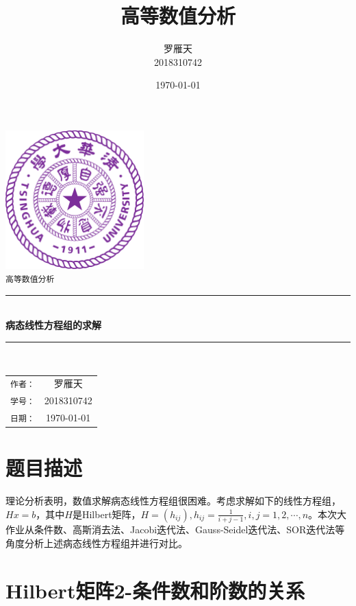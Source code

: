 \documentclass[a4paper]{article}
\title{高等数值分析}
\author{罗雁天 \\
2018310742}
\date{\today}
\begin{document}
\newcommand{\HRule}{\rule{\linewidth}{0.5mm}}
\begin{titlepage}
	\begin{center}
		\includegraphics[width=0.4\textwidth]{Tsinghua2.png}\\[1cm]
		\textsc{\Large \texttt{高等数值分析}}\\[1cm]
		\HRule \\[1cm]
		{\Huge \bfseries 病态线性方程组的求解}\\[0.4cm]
		\HRule \\[3.5cm]
		\begin{minipage}{0.4\textwidth}
			\begin{center}
				\Large
				\begin{tabular}{cc}
					\texttt{作者：} & 罗雁天 \\[0.5cm]
					\texttt{学号：} & 2018310742 \\[0.5cm]
					\texttt{日期：} & \today
				\end{tabular}
			\end{center}
		\end{minipage}
		\vfill
	\end{center}
\end{titlepage}

\section{题目描述}
理论分析表明，数值求解病态线性方程组很困难。考虑求解如下的线性方程组，$Hx=b$，其中$H$是Hilbert矩阵，$H=(h_{ij}),h_{ij}=\frac{1}{i+j-1},i,j=1,2,\cdots,n$。本次大作业从条件数、高斯消去法、Jacobi迭代法、Gauss-Seidel迭代法、SOR迭代法等角度分析上述病态线性方程组并进行对比。

\section{Hilbert矩阵2-条件数和阶数的关系}
\end{document}
